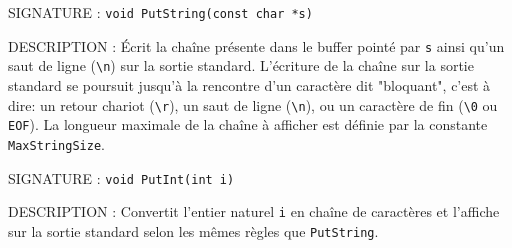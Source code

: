 \documentclass{article}
\begin{document}
		\vspace{3mm}
		\begin{description}
			\item{SIGNATURE : } \texttt{void PutString(const char *s)}
			\item{DESCRIPTION : } Écrit la chaîne présente dans le buffer pointé par \texttt{s} ainsi qu'un saut de ligne (\texttt{\textbackslash{}n}) sur la sortie standard. L'écriture de la chaîne sur la sortie standard se poursuit jusqu'à la rencontre d'un caractère dit "bloquant", c'est à dire: un retour chariot (\texttt{\textbackslash{}r}), un saut de ligne (\texttt{\textbackslash{}n}), ou un caractère de fin (\texttt{\textbackslash{}0} ou \texttt{EOF}). La longueur maximale de la chaîne à afficher est définie par la constante \texttt{MaxStringSize}.
		\end{description}
		\vspace{2.5mm}
		\begin{description}
			\item{SIGNATURE : } \texttt{void PutInt(int i)}
			\item{DESCRIPTION : } Convertit l'entier naturel \texttt{i} en chaîne de caractères et l'affiche sur la sortie standard selon les mêmes règles que \texttt{PutString}.
		\end{description}
\end{document}
